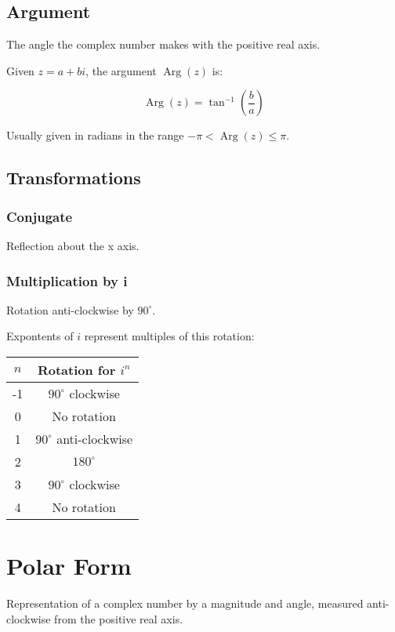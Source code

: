 \documentclass[a4paper,11pt]{report}
\DeclareMathOperator\Arg{Arg}
\begin{document}
\subsection{Argument}

The angle the complex number makes with the positive real axis.

Given $z = a + bi$, the argument $\Arg(z)$ is:

$$
\Arg(z) = \tan^{-1}(\frac{b}{a})
$$

Usually given in radians in the range $-\pi < \Arg(z) \leq \pi$.

\subsection{Transformations}

\subsubsection{Conjugate}

Reflection about the x axis.

\subsubsection{Multiplication by i}

Rotation anti-clockwise by $90^\circ$.

Expontents of $i$ represent multiples of this rotation:

\begin{center}
\begin{tabular}{c|c}
$n$ & Rotation for $i^n$ \\
\hline
-1 & $90^\circ$ clockwise \\
0 & No rotation \\
1 & $90^\circ$ anti-clockwise \\
2 & $180^\circ$ \\
3 & $90^\circ$ clockwise \\
4 & No rotation \\
\end{tabular}
\end{center}


\section{Polar Form}

Representation of a complex number by a magnitude and angle, measured
anti-clockwise from the positive real axis.
\end{document}
